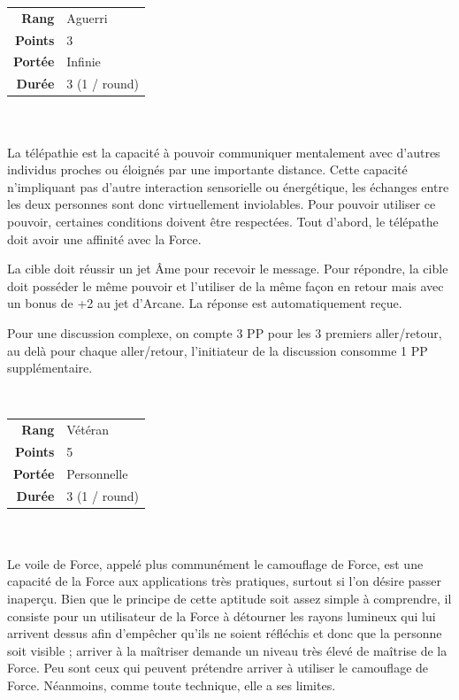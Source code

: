 \begin{description}[align=left]
        \begin{tabular}{ r l }
            \textbf{Rang}    & Aguerri \\
            \textbf{Points}  & 3 \\
            \textbf{Portée}  & Infinie \\
            \textbf{Durée}   & 3 (1 / round) \\
        \end{tabular}
        \\ \\
        La télépathie est la capacité à pouvoir communiquer mentalement avec d’autres individus proches ou éloignés par une importante distance. Cette capacité n’impliquant pas d’autre interaction sensorielle ou énergétique, les échanges entre les deux personnes sont donc virtuellement inviolables. Pour pouvoir utiliser ce pouvoir, certaines conditions doivent être respectées. Tout d’abord, le télépathe doit avoir une affinité avec la Force. 

        La cible doit réussir un jet \^Ame pour recevoir le message. Pour répondre, la cible doit posséder le même pouvoir et l’utiliser de la même façon en retour mais avec un bonus de +2 au jet d’Arcane. La réponse est automatiquement reçue.

        Pour une discussion complexe, on compte 3 PP pour les 3 premiers aller/retour, au delà pour chaque aller/retour, l’initiateur de la discussion consomme 1 PP supplémentaire.
        \\

    \item [Voile de Force] ~ \\

        \begin{tabular}{ r l }
            \textbf{Rang}    & Vétéran \\
            \textbf{Points}  & 5 \\
            \textbf{Portée}  & Personnelle \\
            \textbf{Durée}   & 3 (1 / round) \\
        \end{tabular}
        \\ \\
        Le voile de Force, appelé plus communément le camouflage de Force, est une capacité de la Force aux applications très pratiques, surtout si l’on désire passer inaperçu. Bien que le principe de cette aptitude soit assez simple à comprendre, il consiste pour un utilisateur de la Force à détourner les rayons lumineux qui lui arrivent dessus afin d’empêcher qu’ils ne soient réfléchis et donc que la personne soit visible ; arriver à la maîtriser demande un niveau très élevé de maîtrise de la Force. Peu sont ceux qui peuvent prétendre arriver à utiliser le camouflage de Force. Néanmoins, comme toute technique, elle a ses limites.


\end{description}

